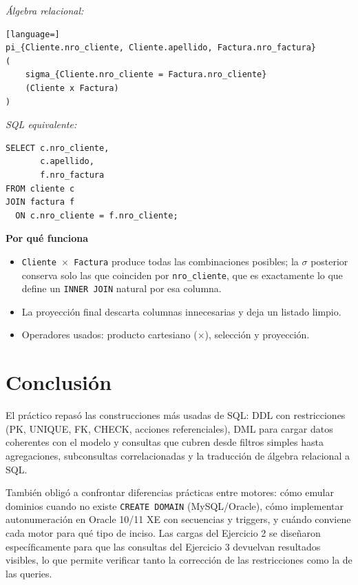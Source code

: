 \documentclass[11pt,a4paper]{article}
\newcommand{\itemcabecera}[1]{\noindent\textbf{#1}\par\medskip}
\newcommand{\bloquePorque}{\itemcabecera{Por qu\'e funciona}}
\begin{document}
\textit{Álgebra relacional:}

\begin{lstlisting}[language=]
pi_{Cliente.nro_cliente, Cliente.apellido, Factura.nro_factura}
(
    sigma_{Cliente.nro_cliente = Factura.nro_cliente}
    (Cliente x Factura)
)
\end{lstlisting}

\textit{SQL equivalente:}

\begin{lstlisting}
SELECT c.nro_cliente,
       c.apellido,
       f.nro_factura
FROM cliente c
JOIN factura f
  ON c.nro_cliente = f.nro_cliente;
\end{lstlisting}

\bloquePorque

\begin{itemize}
    \item \texttt{Cliente $\times$ Factura} produce todas las combinaciones posibles; la $\sigma$ posterior conserva solo las que coinciden por \texttt{nro\_cliente}, que es exactamente lo que define un \texttt{INNER JOIN} natural por esa columna.
    \item La proyección final descarta columnas innecesarias y deja un listado limpio.
    \item Operadores usados: producto cartesiano ($\times$), selección y proyección.
\end{itemize}

\section{Conclusión}

El práctico repasó las construcciones más usadas de SQL: DDL con restricciones (PK, UNIQUE, FK, CHECK, acciones referenciales), DML para cargar datos coherentes con el modelo y consultas que cubren desde filtros simples hasta agregaciones, subconsultas correlacionadas y la traducción de álgebra relacional a SQL.

También obligó a confrontar diferencias prácticas entre motores: cómo emular dominios cuando no existe \texttt{CREATE DOMAIN} (MySQL/Oracle), cómo implementar autonumeración en Oracle 10/11 XE con secuencias y triggers, y cuándo conviene cada motor para qué tipo de inciso. Las cargas del Ejercicio 2 se diseñaron específicamente para que las consultas del Ejercicio 3 devuelvan resultados visibles, lo que permite verificar tanto la corrección de las restricciones como la de las queries.
\end{document}
